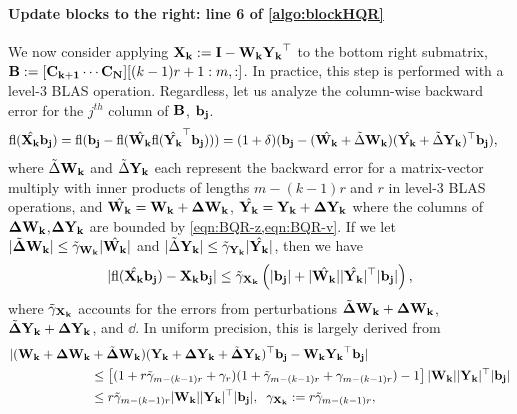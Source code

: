 \paragraph{Update blocks to the right: line 6 of \cref{algo:blockHQR}}
We now consider applying $\mathbf{X_k}:=\mathbf{I}-\mathbf{W_kY_k}^{\top}$ to the bottom right submatrix, $\mathbf{B}:=[\mathbf{C_{k+1}}\cdots \mathbf{C_N}][(k-1)r+1:m,:]$.
In practice, this step is performed with a level-3 BLAS operation. 
Regardless, let us analyze the column-wise backward error for the $j^{th}$ column of $\mathbf{B}$, $\mathbf{b_j}$.
\begin{align*}
	\mathrm{fl}(\hat{\mathbf{X_k}}\mathbf{b_j})=\mathrm{fl}(\mathbf{b_j} - \mathrm{fl}(\hat{\mathbf{W_k}}\mathrm{fl}(\hat{\mathbf{Y_k}}^{\top}\mathbf{b_j}))) & =(1+\delta)(\mathbf{b_j} - (\hat{\mathbf{W_k}} + \tilde{\Delta} \mathbf{W_k}) (\hat{\mathbf{Y_k}} + \tilde{\Delta} \mathbf{Y_k})^{\top}\mathbf{b_j}),
\end{align*}
where $\tilde{\Delta} \mathbf{W_k}$ and $\tilde{\Delta} \mathbf{Y_k}$ each represent the backward error for a matrix-vector multiply with inner products of lengths $m-(k-1)r$ and $r$ in level-3 BLAS operations, and $\hat{\mathbf{W_k}} = \mathbf{W_k}+\mathbf{\Delta W_k}$, $\hat{\mathbf{Y_k}} = \mathbf{Y_k}+\mathbf{\Delta Y_k}$ where the columns of $\mathbf{\Delta W_k}$,$\mathbf{\Delta Y_k}$ are bounded by \cref{eqn:BQR-z,eqn:BQR-v}.
If we let $|\tilde{\mathbf{\Delta}} \mathbf{W_k}| \leq \tilde{\gamma}_{\mathbf{W_k}}|\hat{\mathbf{W_k}}|$ and $|\tilde{\Delta} \mathbf{Y_k}| \leq \tilde{\gamma}_{\mathbf{Y_k}}|\hat{\mathbf{Y_k}}|$, then we have 
\begin{equation*}
	|\mathrm{fl}(\hat{\mathbf{X_k}}\mathbf{b_j}) - \mathbf{X_kb_j}| \leq \tilde{\gamma}_{\mathbf{X_k}} \left(|\mathbf{b_j}|+|\hat{\mathbf{W_k}}||\hat{\mathbf{Y_k}}|^{\top}|\mathbf{b_j}|\right),
\end{equation*}
where $\tilde{\gamma}_{\mathbf{X_k}}$ accounts for the errors from perturbations $\tilde{\mathbf{\Delta}}{\mathbf{W_k}}+\mathbf{\Delta W_k}$, $\tilde{\mathbf{\Delta}}\mathbf{Y_k} + \mathbf{\Delta Y_k}$, and $\dd$.
In uniform precision, this is largely derived from 
\begin{align*}
	|(\mathbf{W_k} +\mathbf{\Delta W_k} &+ \tilde{\mathbf{\Delta}} \mathbf{W_k}) (\mathbf{Y_k} + \mathbf{\Delta Y_k} + \tilde{\mathbf{\Delta}} \mathbf{Y_k})^{\top}\mathbf{b_j} - \mathbf{W_k} \mathbf{Y_k}^{\top}\mathbf{b_j}| \\
	 &\leq \left[(1+r\tilde{\gamma}_{m-(k-1)r}+ \gamma_{r})(1 + \tilde{\gamma}_{m-(k-1)r}+ \gamma_{m-(k-1)r})-1\right]|\mathbf{W_k}||\mathbf{Y_k}|^{\top}|\mathbf{b_j}| \\ 
	 &\leq r\tilde{\gamma}_{m-(k-1)r}|\mathbf{W_k}||\mathbf{Y_k}|^{\top}|\mathbf{b_j}|,\;\; \gamma_{\mathbf{X_k}} := r\tilde{\gamma}_{m-(k-1)r},
\end{align*}
